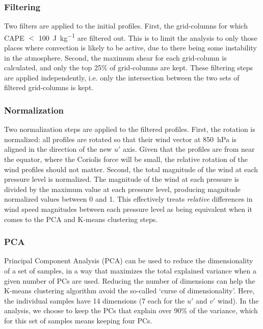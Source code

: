 \documentclass[11pt,a4paper]{article}
\begin{document}
\subsubsection{Filtering}

Two filters are applied to the initial profiles. First, the grid-columns for which CAPE $<$ \SI{100}{J.kg^{-1}} are filtered out. This is to limit the analysis to only those places where convection is likely to be active, due to there being some instability in the atmosphere. Second, the maximum shear for each grid-column is calculated, and only the top 25\% of grid-columns are kept. These filtering steps are applied independently, i.e. only the intersection between the two sets of filtered grid-columns is kept.

\subsubsection{Normalization}

Two normalization steps are applied to the filtered profiles. First, the rotation is normalized: all profiles are rotated so that their wind vector at \SI{850}{hPa} is aligned in the direction of the new $u'$ axis. Given that the profiles are from near the equator, where the Coriolis force will be small, the relative rotation of the wind profiles should not matter. Second, the total magnitude of the wind at each pressure level is normalized. The magnitude of the wind at each pressure is divided by the maximum value at each pressure level, producing magnitude normalized values between 0 and 1. This effectively treats \textit{relative} differences in wind speed magnitudes between each pressure level as being equivalent when it comes to the PCA and K-means clustering steps.

\subsubsection{PCA}

Principal Component Analysis (PCA) can be used to reduce the dimensionality of a set of samples, in a way that maximizes the total explained variance when a given number of PCs are used. Reducing the number of dimensions can help the K-means clustering algorithm avoid the so-called `curse of dimensionality'. Here, the individual samples have 14 dimensions (7 each for the $u'$ and $v'$ wind). In the analysis, we choose to keep the PCs that explain over 90\% of the variance, which for this set of samples means keeping four PCs. 
\end{document}
